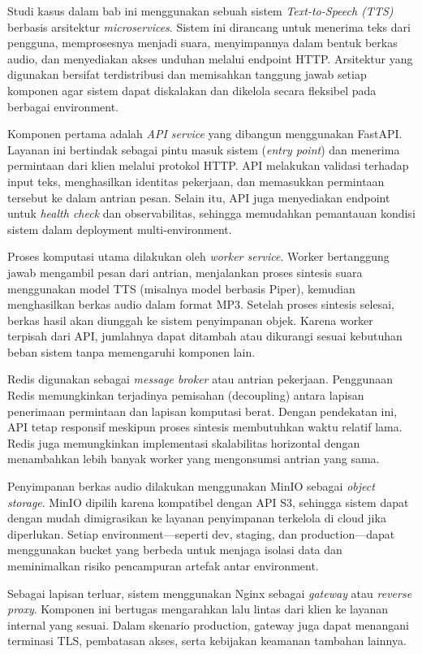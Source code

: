 Studi kasus dalam bab ini menggunakan sebuah sistem \textit{Text-to-Speech (TTS)} berbasis arsitektur \textit{microservices}. Sistem ini dirancang untuk menerima teks dari pengguna, memprosesnya menjadi suara, menyimpannya dalam bentuk berkas audio, dan menyediakan akses unduhan melalui endpoint HTTP. Arsitektur yang digunakan bersifat terdistribusi dan memisahkan tanggung jawab setiap komponen agar sistem dapat diskalakan dan dikelola secara fleksibel pada berbagai environment.

Komponen pertama adalah \textit{API service} yang dibangun menggunakan FastAPI. Layanan ini bertindak sebagai pintu masuk sistem (\textit{entry point}) dan menerima permintaan dari klien melalui protokol HTTP. API melakukan validasi terhadap input teks, menghasilkan identitas pekerjaan, dan memasukkan permintaan tersebut ke dalam antrian pesan. Selain itu, API juga menyediakan endpoint untuk \textit{health check} dan observabilitas, sehingga memudahkan pemantauan kondisi sistem dalam deployment multi-environment.

Proses komputasi utama dilakukan oleh \textit{worker service}. Worker bertanggung jawab mengambil pesan dari antrian, menjalankan proses sintesis suara menggunakan model TTS (misalnya model berbasis Piper), kemudian menghasilkan berkas audio dalam format MP3. Setelah proses sintesis selesai, berkas hasil akan diunggah ke sistem penyimpanan objek. Karena worker terpisah dari API, jumlahnya dapat ditambah atau dikurangi sesuai kebutuhan beban sistem tanpa memengaruhi komponen lain.

Redis digunakan sebagai \textit{message broker} atau antrian pekerjaan. Penggunaan Redis memungkinkan terjadinya pemisahan (decoupling) antara lapisan penerimaan permintaan dan lapisan komputasi berat. Dengan pendekatan ini, API tetap responsif meskipun proses sintesis membutuhkan waktu relatif lama. Redis juga memungkinkan implementasi skalabilitas horizontal dengan menambahkan lebih banyak worker yang mengonsumsi antrian yang sama.

Penyimpanan berkas audio dilakukan menggunakan MinIO sebagai \textit{object storage}. MinIO dipilih karena kompatibel dengan API S3, sehingga sistem dapat dengan mudah dimigrasikan ke layanan penyimpanan terkelola di cloud jika diperlukan. Setiap environment—seperti dev, staging, dan production—dapat menggunakan bucket yang berbeda untuk menjaga isolasi data dan meminimalkan risiko pencampuran artefak antar environment.

Sebagai lapisan terluar, sistem menggunakan Nginx sebagai \textit{gateway} atau \textit{reverse proxy}. Komponen ini bertugas mengarahkan lalu lintas dari klien ke layanan internal yang sesuai. Dalam skenario production, gateway juga dapat menangani terminasi TLS, pembatasan akses, serta kebijakan keamanan tambahan lainnya.

